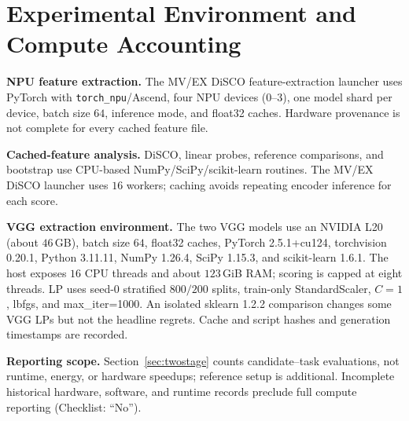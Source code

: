 \documentclass{article}
\begin{document}
\section{Experimental Environment and Compute Accounting}
\label{app:environment}

\textbf{NPU feature extraction.} The MV/EX DiSCO feature-extraction launcher uses PyTorch with \texttt{torch\_npu}/Ascend, four NPU devices (0--3), one model shard per device, batch size $64$, inference mode, and float32 caches. Hardware provenance is not complete for every cached feature file.

\textbf{Cached-feature analysis.} DiSCO, linear probes, reference comparisons, and bootstrap use CPU-based NumPy/SciPy/scikit-learn routines. The MV/EX DiSCO launcher uses $16$ workers; caching avoids repeating encoder inference for each score.

\textbf{VGG extraction environment.} The two VGG models use an NVIDIA L20 (about $46$\,GB), batch size $64$, float32 caches, PyTorch 2.5.1+cu124, torchvision 0.20.1, Python 3.11.11, NumPy 1.26.4, SciPy 1.15.3, and scikit-learn 1.6.1. The host exposes $16$ CPU threads and about $123$\,GiB RAM; scoring is capped at eight threads. LP uses seed-0 stratified $800/200$ splits, train-only StandardScaler, $C=1$, lbfgs, and max\_iter=1000. An isolated sklearn 1.2.2 comparison changes some VGG LPs but not the headline regrets. Cache and script hashes and generation timestamps are recorded.

\textbf{Reporting scope.} Section~\ref{sec:twostage} counts candidate--task evaluations, not runtime, energy, or hardware speedups; reference setup is additional. Incomplete historical hardware, software, and runtime records preclude full compute reporting (Checklist: ``No'').

\clearpage
\renewcommand{\thepage}{C\arabic{page}}
\setcounter{page}{1}

\end{document}
